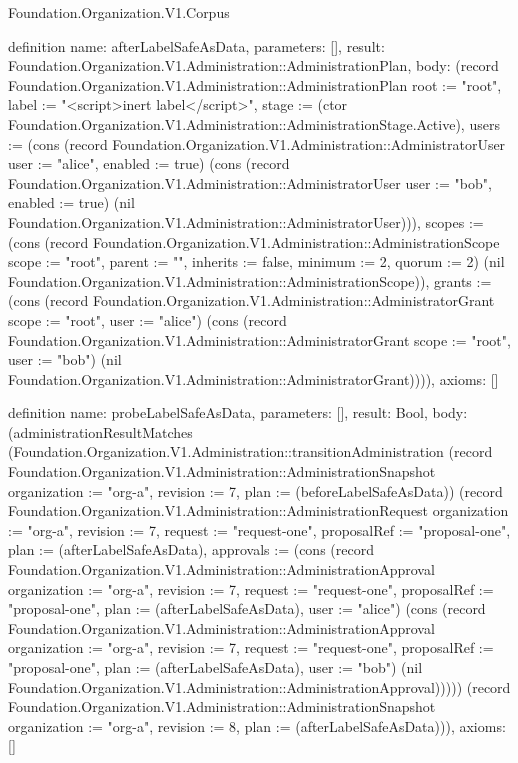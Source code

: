 \begin{lexlean}{Foundation.Organization.V1.Corpus}
\begin{semanticmodule}
definition{
  name: afterLabelSafeAsData,
  parameters: [],
  result: Foundation.Organization.V1.Administration::AdministrationPlan,
  body: (record Foundation.Organization.V1.Administration::AdministrationPlan {root := "root", label := "<script>inert label</script>", stage := (ctor Foundation.Organization.V1.Administration::AdministrationStage.Active), users := (cons (record Foundation.Organization.V1.Administration::AdministratorUser {user := "alice", enabled := true}) (cons (record Foundation.Organization.V1.Administration::AdministratorUser {user := "bob", enabled := true}) (nil Foundation.Organization.V1.Administration::AdministratorUser))), scopes := (cons (record Foundation.Organization.V1.Administration::AdministrationScope {scope := "root", parent := "", inherits := false, minimum := 2, quorum := 2}) (nil Foundation.Organization.V1.Administration::AdministrationScope)), grants := (cons (record Foundation.Organization.V1.Administration::AdministratorGrant {scope := "root", user := "alice"}) (cons (record Foundation.Organization.V1.Administration::AdministratorGrant {scope := "root", user := "bob"}) (nil Foundation.Organization.V1.Administration::AdministratorGrant)))}),
  axioms: []
}

definition{
  name: probeLabelSafeAsData,
  parameters: [],
  result: Bool,
  body: (administrationResultMatches (Foundation.Organization.V1.Administration::transitionAdministration (record Foundation.Organization.V1.Administration::AdministrationSnapshot {organization := "org-a", revision := 7, plan := (beforeLabelSafeAsData)}) (record Foundation.Organization.V1.Administration::AdministrationRequest {organization := "org-a", revision := 7, request := "request-one", proposalRef := "proposal-one", plan := (afterLabelSafeAsData), approvals := (cons (record Foundation.Organization.V1.Administration::AdministrationApproval {organization := "org-a", revision := 7, request := "request-one", proposalRef := "proposal-one", plan := (afterLabelSafeAsData), user := "alice"}) (cons (record Foundation.Organization.V1.Administration::AdministrationApproval {organization := "org-a", revision := 7, request := "request-one", proposalRef := "proposal-one", plan := (afterLabelSafeAsData), user := "bob"}) (nil Foundation.Organization.V1.Administration::AdministrationApproval)))})) (record Foundation.Organization.V1.Administration::AdministrationSnapshot {organization := "org-a", revision := 8, plan := (afterLabelSafeAsData)})),
  axioms: []
}


\end{semanticmodule}
\end{lexlean}
